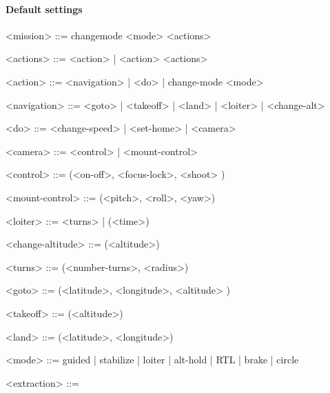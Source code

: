 \documentclass{article}
\begin{document}
	\paragraph{Default settings}
	\begin{grammar}
		
		<mission> ::= changemode <mode> <actions>
		
		<actions> ::= <action> | <action> <actions>
		
		<action> ::= <navigation> | <do> | change-mode <mode>
		
		<navigation> ::= <goto> | <takeoff> | <land> | <loiter> | <change-alt>
		
		<do> ::= <change-speed> | <set-home> | <camera> 
		
		<camera> ::= <control> | <mount-control> 
		
		<control> ::= (<on-off>, <focus-lock>, <shoot> )
		
		<mount-control> ::= (<pitch>, <roll>, <yaw>)
		
		<loiter> ::= <turns> | (<time>)
		
		<change-altitude> ::= (<altitude>)
		
		<turns> ::= (<number-turns>, <radius>)
		
		<goto> ::= (<latitude>, <longitude>, <altitude> ) 
		
		<takeoff> ::= (<altitude>)
		
		<land> ::= (<latitude>, <longitude>)
		
		<mode> ::= guided | stabilize | loiter | alt-hold | RTL | brake | circle
		
		
		
		
		
		<extraction> ::= 
		
	\end{grammar}
\end{document}
